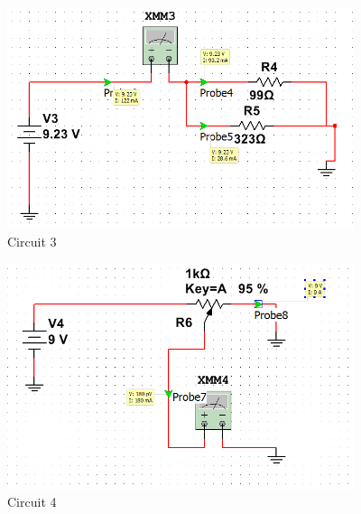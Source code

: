 \documentclass[12pt]{article}
\begin{document}
\begin{figure}[h!] %
   \centering
   \includegraphics[width=4in]{Circuit_3.PNG} 
   \caption{Circuit 3}
   \label{fig:example}
\end{figure}

\newpage

\begin{figure}[h!] %
   \centering
   \includegraphics[width=4in]{Circuit_4.PNG} 
   \caption{Circuit 4}
   \label{fig:example}
\end{figure}
\end{document}
